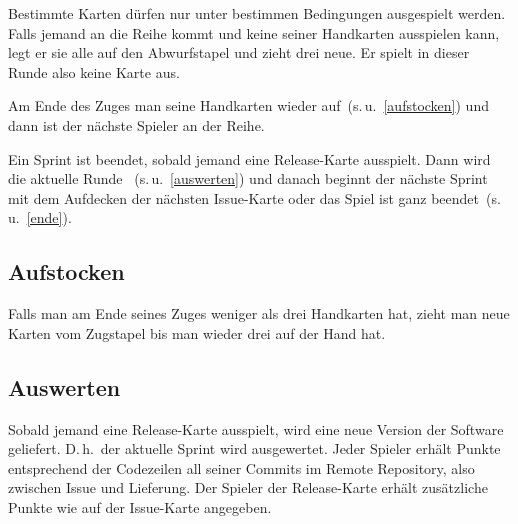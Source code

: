 \documentclass[DIV=15, fontsize=11pt]{gitgame}
\begin{document}

Bestimmte Karten dürfen nur unter bestimmen Bedingungen ausgespielt werden. Falls jemand an die Reihe kommt und keine seiner Handkarten ausspielen kann, legt er sie alle auf den Abwurfstapel und zieht drei neue. Er spielt in dieser Runde also keine Karte aus.

Am Ende des Zuges  man seine Handkarten wieder auf~(s.\,u.~\ref{aufstocken}) und dann ist der nächste Spieler an der Reihe.

Ein Sprint ist beendet, sobald jemand eine Release-Karte ausspielt. Dann wird die aktuelle Runde ~(s.\,u.~\ref{auswerten}) und danach beginnt der nächste Sprint mit dem Aufdecken der nächsten Issue-Karte oder das Spiel ist ganz beendet~(s.\,u.~\ref{ende}).


\subsection{Aufstocken\label{aufstocken}}
Falls man am Ende seines Zuges weniger als drei Handkarten hat, zieht man neue Karten vom Zugstapel bis man wieder drei auf der Hand hat.


\subsection{Auswerten\label{auswerten}}
Sobald jemand eine Release-Karte ausspielt, wird eine neue Version der Software geliefert. D.\,h.\ der aktuelle Sprint wird ausgewertet. Jeder Spieler erhält Punkte entsprechend der Codezeilen all seiner Commits im Remote Repository, also zwischen Issue und Lieferung. Der Spieler der Release-Karte erhält zusätzliche Punkte wie auf der Issue-Karte angegeben.
\end{document}

